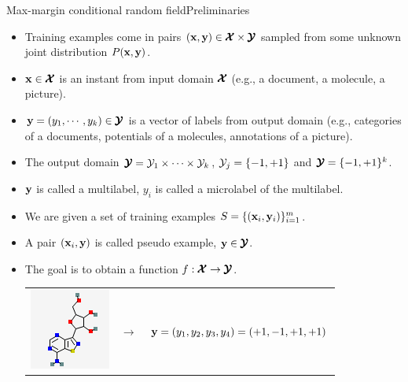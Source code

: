 \documentclass[first=dgreen,second=purple,logo=yellowexc]{aaltoslides}
\begin{document}
{\begin{frame}{Max-margin conditional random field}{Preliminaries}
	\begin{itemize}
		\item Training examples come in pairs $(\mathbf {x},\mathbf {y})\in\pmb {\mathcal{X}}\times\pmb {\mathcal{Y}}$ sampled from some unknown joint distribution $P(\mathbf {x},\mathbf {y})$.
		\item $\mathbf {x}\in\pmb {\mathcal{X}}$ is an instant from input domain $\pmb {\mathcal{X}}$ (e.g., a document, a molecule, a picture).
		\item $\mathbf {y}=(y_1,\cdots,y_k)\in\pmb {\mathcal{Y}}$ is a vector of labels from output domain (e.g., categories of a documents, potentials of a molecules, annotations of a picture).
		\item The output domain $\pmb {\mathcal{Y}}=\mathcal{Y}_1\times\cdots\times\mathcal{Y}_k$, $\mathcal{Y}_j=\{-1,+1\}$ and $\pmb {\mathcal{Y}}=\{-1,+1\}^k$.
		\item $\mathbf {y}$ is called a multilabel, $y_i$ is called a microlabel of the multilabel.
		\item We are given a set of training examples $S=\{(\mathbf {x}_i,\mathbf {y}_i)\}_{i=1}^m$.
		\item A pair $(\mathbf {x}_i,\mathbf {y})$ is called pseudo example, $\mathbf {y}\in\pmb {\mathcal{Y}}$.
		\item The goal is to obtain a function $f:\pmb {\mathcal{X}}\rightarrow\pmb {\mathcal{Y}}$.
		\begin{table}
		\footnotesize
		\begin{tabular}{p{1cm}p{1cm}p{10cm}}
        \multirow{3}{*}{\includegraphics[scale = 0.3]{./figures/mol1.png}} & 
			& \\ 
		& $\rightarrow$	& $\mathbf {y}=(y_1,y_2,y_3,y_4)=(+1,-1,+1,+1)$ \\
		&	& \\ 
        \end{tabular}
        \end{table}
	\end{itemize}
\end{frame}

}
\end{document}
